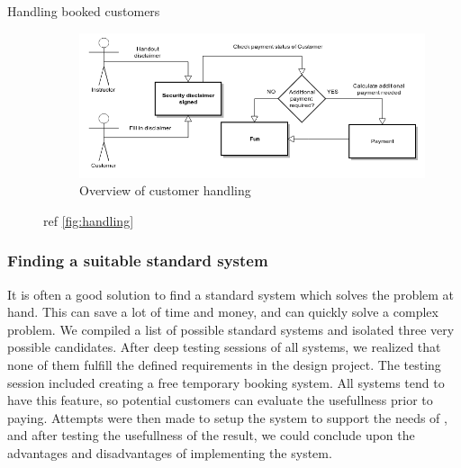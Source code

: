 \begin{description}
\item[Handling booked customers]

\begin{figure}[htbp]
    \centering
        \includegraphics[width=\textwidth]{figures/handling.png}
            \caption{Overview of customer handling}
        \label{fig:handling}
\end{figure}
ref \autoref{fig:handling}

\end{description}

\subsubsection{Finding a suitable standard system}
It is often a good solution to find a standard system which solves the problem 
at hand. This can save a lot of time and money, and can quickly solve a complex
problem.
We compiled a list of possible standard systems and isolated three very possible
candidates. After deep testing sessions of all systems, we realized that none
of them fulfill the defined requirements in the design project. The testing
session included creating a free temporary booking system. All systems tend to 
have this feature, so potential customers can evaluate the usefullness prior to 
paying. Attempts were then made to setup the system to support the needs of
\gomonkey{}, and after testing the usefullness of the result, we could conclude
upon the advantages and disadvantages of implementing the system.

